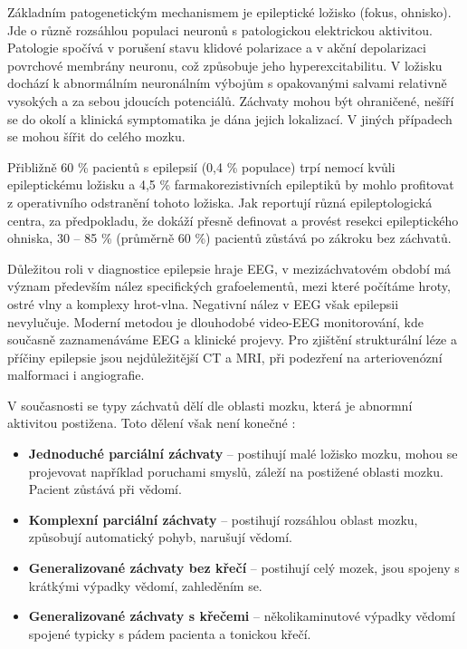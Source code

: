 Základním patogenetickým mechanismem je epileptické ložisko (fokus, ohnisko). Jde o různě rozsáhlou populaci neuronů s patologickou elektrickou aktivitou. Patologie spočívá v porušení stavu klidové polarizace a v akční depolarizaci povrchové membrány neuronu, což způsobuje jeho hyperexcitabilitu. V ložisku dochází k abnormálním neuronálním výbojům s opakovanými salvami relativně vysokých a za sebou jdoucích potenciálů. Záchvaty mohou být ohraničené, nešíří se do okolí a klinická symptomatika je dána jejich lokalizací. V jiných případech se mohou šířit do celého mozku. \cite{2}

Přibližně 60 \% pacientů s epilepsií (0,4 \% populace) trpí nemocí kvůli epileptickému ložisku a 4,5 \% farmakorezistivních epileptiků by mohlo profitovat z operativního odstranění tohoto ložiska. Jak reportují různá epileptologická centra, za předpokladu, že dokáží přesně definovat a provést resekci epileptického ohniska, 30 – 85 \% (průměrně 60 \%) pacientů zůstává po zákroku bez záchvatů. \cite{6,4}

Důležitou roli v diagnostice epilepsie hraje EEG, v mezizáchvatovém období má význam především nález specifických grafoelementů, mezi které počítáme hroty, ostré vlny a komplexy hrot-vlna. Negativní nález v EEG však epilepsii nevylučuje. Moderní metodou je dlouhodobé video-EEG monitorování, kde současně zaznamenáváme EEG a klinické projevy. Pro zjištění strukturální léze a příčiny epilepsie jsou nejdůležitější CT a MRI, při podezření na arteriovenózní malformaci i angiografie. \cite{2}

V současnosti se typy záchvatů dělí dle oblasti mozku, která je abnormní aktivitou postižena. Toto dělení však není konečné \cite{71}:

\begin{itemize}
\item \textbf{Jednoduché parciální záchvaty } – postihují malé ložisko mozku, mohou se projevovat například poruchami smyslů, záleží na postižené oblasti mozku. Pacient zůstává při vědomí.
\item \textbf{Komplexní parciální záchvaty } – postihují rozsáhlou oblast mozku, způsobují automatický pohyb, narušují vědomí.
\item \textbf{Generalizované záchvaty bez křečí} – postihují celý mozek, jsou spojeny s krátkými výpadky vědomí, zahleděním se.
\item \textbf{Generalizované záchvaty s křečemi} – několikaminutové výpadky vědomí spojené typicky s pádem pacienta a tonickou křečí.
\end{itemize}


